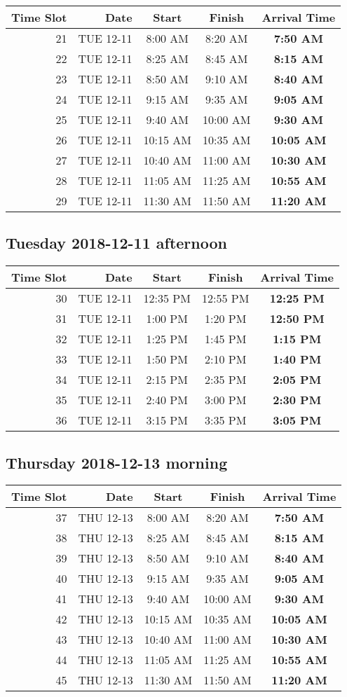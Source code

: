 \documentclass[]{book}
\theoremstyle{definition}
\theoremstyle{definition}
\theoremstyle{definition}
\theoremstyle{remark}
\begin{document}
\begin{longtable}[]{@{}rrccc@{}}
\toprule
Time Slot & Date & Start & Finish & \textbf{Arrival Time}\tabularnewline
\midrule
\endhead
21 & TUE 12-11 & 8:00 AM & 8:20 AM & \textbf{7:50 AM}\tabularnewline
22 & TUE 12-11 & 8:25 AM & 8:45 AM & \textbf{8:15 AM}\tabularnewline
23 & TUE 12-11 & 8:50 AM & 9:10 AM & \textbf{8:40 AM}\tabularnewline
24 & TUE 12-11 & 9:15 AM & 9:35 AM & \textbf{9:05 AM}\tabularnewline
25 & TUE 12-11 & 9:40 AM & 10:00 AM & \textbf{9:30 AM}\tabularnewline
26 & TUE 12-11 & 10:15 AM & 10:35 AM & \textbf{10:05 AM}\tabularnewline
27 & TUE 12-11 & 10:40 AM & 11:00 AM & \textbf{10:30 AM}\tabularnewline
28 & TUE 12-11 & 11:05 AM & 11:25 AM & \textbf{10:55 AM}\tabularnewline
29 & TUE 12-11 & 11:30 AM & 11:50 AM & \textbf{11:20 AM}\tabularnewline
\bottomrule
\end{longtable}

\hypertarget{tuesday-2018-12-11-afternoon}{%
\subsection{Tuesday 2018-12-11
afternoon}\label{tuesday-2018-12-11-afternoon}}

\begin{longtable}[]{@{}rrccc@{}}
\toprule
Time Slot & Date & Start & Finish & \textbf{Arrival Time}\tabularnewline
\midrule
\endhead
30 & TUE 12-11 & 12:35 PM & 12:55 PM & \textbf{12:25 PM}\tabularnewline
31 & TUE 12-11 & 1:00 PM & 1:20 PM & \textbf{12:50 PM}\tabularnewline
32 & TUE 12-11 & 1:25 PM & 1:45 PM & \textbf{1:15 PM}\tabularnewline
33 & TUE 12-11 & 1:50 PM & 2:10 PM & \textbf{1:40 PM}\tabularnewline
34 & TUE 12-11 & 2:15 PM & 2:35 PM & \textbf{2:05 PM}\tabularnewline
35 & TUE 12-11 & 2:40 PM & 3:00 PM & \textbf{2:30 PM}\tabularnewline
36 & TUE 12-11 & 3:15 PM & 3:35 PM & \textbf{3:05 PM}\tabularnewline
\bottomrule
\end{longtable}

\hypertarget{thursday-2018-12-13-morning}{%
\subsection{Thursday 2018-12-13
morning}\label{thursday-2018-12-13-morning}}

\begin{longtable}[]{@{}rrccc@{}}
\toprule
Time Slot & Date & Start & Finish & \textbf{Arrival Time}\tabularnewline
\midrule
\endhead
37 & THU 12-13 & 8:00 AM & 8:20 AM & \textbf{7:50 AM}\tabularnewline
38 & THU 12-13 & 8:25 AM & 8:45 AM & \textbf{8:15 AM}\tabularnewline
39 & THU 12-13 & 8:50 AM & 9:10 AM & \textbf{8:40 AM}\tabularnewline
40 & THU 12-13 & 9:15 AM & 9:35 AM & \textbf{9:05 AM}\tabularnewline
41 & THU 12-13 & 9:40 AM & 10:00 AM & \textbf{9:30 AM}\tabularnewline
42 & THU 12-13 & 10:15 AM & 10:35 AM & \textbf{10:05 AM}\tabularnewline
43 & THU 12-13 & 10:40 AM & 11:00 AM & \textbf{10:30 AM}\tabularnewline
44 & THU 12-13 & 11:05 AM & 11:25 AM & \textbf{10:55 AM}\tabularnewline
45 & THU 12-13 & 11:30 AM & 11:50 AM & \textbf{11:20 AM}\tabularnewline
\bottomrule
\end{longtable}
\end{document}
